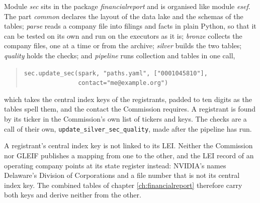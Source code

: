 Module \emph{sec} sits in the package \emph{financialreport} and is organised like module \emph{esef}. The part \emph{common} declares the layout of the data lake and the schemas of the tables; \emph{parse} reads a company file into filings and facts in plain Python, so that it can be tested on its own and run on the executors as it is; \emph{bronze} collects the company files, one at a time or from the archive; \emph{silver} builds the two tables; \emph{quality} holds the checks; and \emph{pipeline} runs collection and tables in one call,
\begin{quote}
\verb|sec.update_sec(spark, "paths.yaml", ["0001045810"],|\\
\verb|               contact="me@example.org")|
\end{quote}
which takes the central index keys of the registrants, padded to ten digits as the tables spell them, and the contact the Commission requires. A registrant is found by its ticker in the Commission's own list of tickers and keys. The checks are a call of their own, \verb|update_silver_sec_quality|, made after the pipeline has run.

A registrant's central index key is not linked to its LEI. Neither the Commission nor GLEIF publishes a mapping from one to the other, and the LEI record of an operating company points at its state register instead: NVIDIA's names Delaware's Division of Corporations and a file number that is not its central index key. The combined tables of chapter \ref{ch:financialreport} therefore carry both keys and derive neither from the other.
